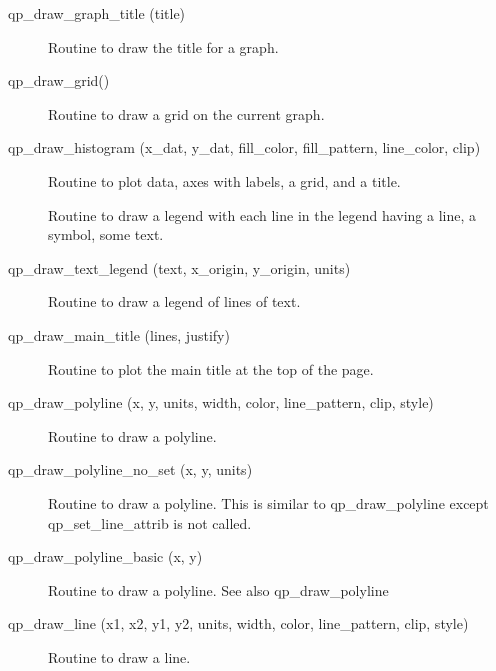 \begin{description}
\label{r:qp.draw.graph.title}
\item[qp_draw_graph_title (title)] \Newline 
     Routine to draw the title for a graph.

\label{r:qp.draw.grid}
\item[qp_draw_grid()] \Newline 
     Routine to draw a grid on the current graph.

\label{r:qp.draw.histogram}
\item[qp_draw_histogram (x_dat, y_dat, fill_color, fill_pattern, line_color, clip)] \Newline 
     Routine to plot data, axes with labels, a grid, and a title.

\label{r:qp.draw.curve.legend}
\item[\protect\parbox{6in}{qp_draw_curve_legend (origin, legend, line, symbol, text) }] \Newline
Routine to draw a legend with each line in the legend having
  a line, a symbol, some text.

\label{r:qp.draw.text.legend}
\item[qp_draw_text_legend (text, x_origin, y_origin, units)] \Newline 
Routine to draw a legend of lines of text.

\label{r:qp.draw.main.title}
\item[qp_draw_main_title (lines, justify)] \Newline 
     Routine to plot the main title at the top of the page.

\label{r:qp.draw.polyline}
\item[qp_draw_polyline (x, y, units, width, color, line_pattern, clip, style)] \Newline 
     Routine to draw a polyline.

\label{r:qp.draw.polyline.no.set}
\item[qp_draw_polyline_no_set (x, y, units)] \Newline 
Routine to draw a polyline.
This is similar to qp_draw_polyline except qp_set_line_attrib is not called.

\label{r:qp.draw.polyline.basic}
\item[qp_draw_polyline_basic (x, y)] \Newline 
     Routine to draw a polyline. See also qp_draw_polyline

\label{r:qp.draw.line}
\item[qp_draw_line (x1, x2, y1, y2, units, width, color, line_pattern, clip, style)] \Newline 
     Routine to draw a line.


\end{description}
